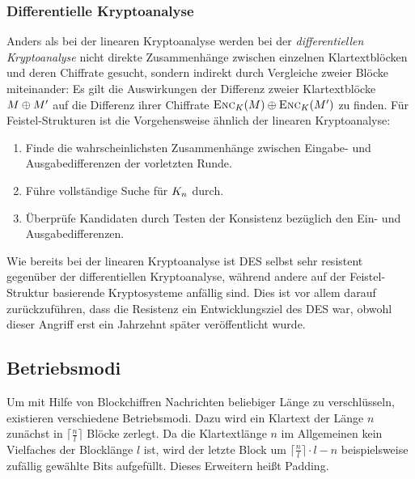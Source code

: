\subsubsection{Differentielle Kryptoanalyse}
\label{sssec:diffKryptoanalyse}
Anders als bei der linearen Kryptoanalyse werden bei der \emph{differentiellen Kryptoanalyse} nicht direkte Zusammenhänge zwischen einzelnen Klartextblöcken und deren Chiffrate gesucht, sondern indirekt durch Vergleiche zweier Blöcke miteinander: Es gilt die Auswirkungen der Differenz zweier Klartextblöcke $M \oplus M'$ auf die Differenz ihrer Chiffrate $\textsc{Enc}_{K}(M) \oplus \textsc{Enc}_{K}(M')$ zu finden.
Für Feistel-Strukturen ist die Vorgehensweise ähnlich der linearen Kryptoanalyse:
\begin{enumerate}
	\item Finde die wahrscheinlichsten Zusammenhänge zwischen Eingabe- und Ausgabedifferenzen der vorletzten Runde.
	\item Führe vollständige Suche für $K_n$ durch.
	\item Überprüfe Kandidaten durch Testen der Konsistenz bezüglich den Ein- und Ausgabedifferenzen.
\end{enumerate}

Wie bereits bei der linearen Kryptoanalyse ist DES selbst sehr resistent gegenüber der differentiellen Kryptoanalyse, während andere auf der Feistel-Struktur basierende Kryptosysteme anfällig sind. Dies ist vor
allem darauf zurückzuführen, dass die Resistenz ein Entwicklungsziel des DES war, obwohl dieser Angriff erst ein Jahrzehnt später veröffentlicht wurde.

\subsection{Betriebsmodi}
Um mit Hilfe von Blockchiffren Nachrichten beliebiger Länge zu verschlüsseln, existieren verschiedene Betriebsmodi. Dazu wird ein Klartext der Länge $n$ zunächst in $\lceil \frac{n}{l} \rceil$ Blöcke zerlegt. Da die Klartextlänge $n$ im Allgemeinen kein Vielfaches der Blocklänge $l$ ist, wird der letzte Block um $\lceil \frac{n}{l} \rceil  \cdot l - n$ beispielsweise zufällig gewählte Bits aufgefüllt. Dieses Erweitern heißt Padding. 

